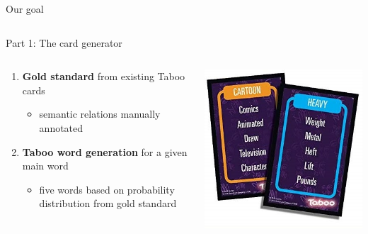 \documentclass[11pt]{beamer}
\begin{document}
\begin{frame}{Our goal}
\begin{columns}
\begin{column}{0.5\textwidth}
\end{column}
	
\end{columns}

\end{frame}


\begin{frame}{Part 1: The card generator}

\begin{columns}
	
	\begin{column}{0.5\textwidth}


	\begin{enumerate}
		\item \textbf{Gold standard} from existing Taboo cards
		\begin{itemize}
			\item semantic relations manually annotated
		\end{itemize}
		\item \textbf{Taboo word generation} for a given main word
		\begin{itemize}
			\item five words based on probability distribution from gold standard
		\end{itemize}
	\end{enumerate}

	\end{column}
	
	\begin{column}{0.5\textwidth}
		
		
		\begin{center}
			\includegraphics[width=.9\linewidth]{cards.jpg}
		\end{center}


\end{column}
\end{columns}
\end{frame}
\end{document}
